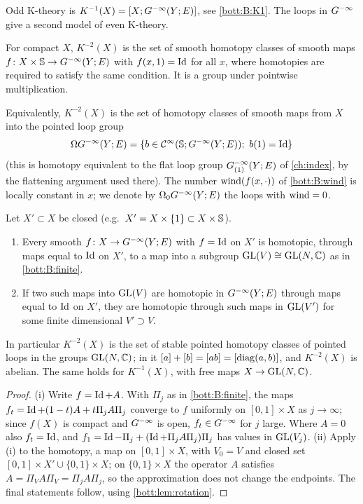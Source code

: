Odd K-theory is $K^{-1}(X)=[X;G^{-\infty}(Y;E)]$, see \ref{bott:B:K1}. The loops in
$G^{-\infty}$ give a second model of even K-theory.

\begin{definition}\label{bott:def:K2}
  For compact $X$, $K^{-2}(X)$ is the set of smooth homotopy classes of smooth maps
  $f\colon X\times\mathbb{S}\to G^{-\infty}(Y;E)$ with $f(x,1)=\operatorname{Id}$ for all $x$, where
  homotopies are required to satisfy the same condition. It is a group under
  pointwise multiplication.
\end{definition}

Equivalently, $K^{-2}(X)$ is the set of homotopy classes of smooth maps from $X$
into the pointed loop group
\begin{equation*}
  \Omega\Ginf(Y;E)=\{b\in\CI(\Sphere;\Ginf(Y;E));\ b(1)=\Id\}
\end{equation*}
(this is homotopy equivalent to the flat loop group $G^{-\infty}_{(1)}(Y;E)$ of
\cref{ch:index}, by the flattening argument used there). The number
$\operatorname{wind}(f(x,\cdot))$ of \ref{bott:B:wind} is locally constant in $x$; we denote by
$\Omega_0G^{-\infty}(Y;E)$ the loops with $\operatorname{wind}=0$.

\begin{lemma}\label{bott:lem:stable}
  Let $X'\subset X$ be closed (e.g.\ $X'=X\times\{1\}\subset X\times\mathbb{S}$).
  \begin{enumerate}[label=(\roman*)]
  \item Every smooth $f\colon X\to G^{-\infty}(Y;E)$ with $f=\operatorname{Id}$ on $X'$ is homotopic,
    through maps equal to $\operatorname{Id}$ on $X'$, to a map into a subgroup $\operatorname{GL}(V)\cong\operatorname{GL}(N,\mathbb{C})$
    as in \ref{bott:B:finite}.
  \item If two such maps into $\operatorname{GL}(V)$ are homotopic in $G^{-\infty}(Y;E)$ through maps
    equal to $\operatorname{Id}$ on $X'$, they are homotopic through such maps in $\operatorname{GL}(V')$ for some
    finite dimensional $V'\supset V$.
  \end{enumerate}
  In particular $K^{-2}(X)$ is the set of stable pointed homotopy classes of pointed
  loops in the groups $\operatorname{GL}(N,\mathbb{C})$; in it $[a]+[b]=[ab]=[\operatorname{diag}(a,b)]$, and
  $K^{-2}(X)$ is abelian. The same holds for $K^{-1}(X)$, with free maps $X\to\operatorname{GL}(N,\mathbb{C})$.
\end{lemma}
\begin{proof}
  (i) Write $f=\operatorname{Id}+A$. With $\Pi_j$ as in \ref{bott:B:finite}, the maps
  $f_t=\operatorname{Id}+(1-t)A+t\Pi_jA\Pi_j$ converge to $f$ uniformly on $[0,1]\times X$ as
  $j\to\infty$; since $f(X)$ is compact and $G^{-\infty}$ is open, $f_t\in G^{-\infty}$ for $j$
  large. Where $A=0$ also $f_t=\operatorname{Id}$, and $f_1=\operatorname{Id}-\Pi_j+(\operatorname{Id}+\Pi_jA\Pi_j)\Pi_j$ has
  values in $\operatorname{GL}(V_j)$.
  (ii) Apply (i) to the homotopy, a map on $[0,1]\times X$, with $V_0=V$ and closed
  set $[0,1]\times X'\cup\{0,1\}\times X$; on $\{0,1\}\times X$ the operator
  $A$ satisfies $A=\Pi_VA\Pi_V=\Pi_jA\Pi_j$, so the approximation does not change
  the endpoints. The final statements follow, using \cref{bott:lem:rotation}.
\end{proof}

